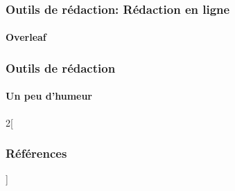 \documentclass[xcolor=table]{beamer}
\begin{document}
\begin{frame}
\frametitle{Outils de rédaction: Rédaction en ligne}
\framesubtitle{Overleaf}


\end{frame}

\begin{frame}
\frametitle{Outils de rédaction}
\framesubtitle{Un peu d'humeur}


\end{frame}

\nocite{*}
%
% 

\begin{multicols*}{2}[\frametitle{Références}]%
	\tiny
	
	
\end{multicols*}
\end{document}
